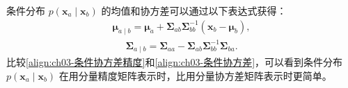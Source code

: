 \documentclass[../../main.tex]{subfiles}
\begin{document}
条件分布 $p(\boldsymbol{x}_{a}\mid\boldsymbol{x}_{b})$ 的均值和协方差可以通过以下表达式获得：
\begin{align}
\boldsymbol{\mu}_{a\mid b}=\boldsymbol{\mu}_{a}+\boldsymbol{\Sigma}_{ab}\boldsymbol{\Sigma}_{bb}^{-1}(\boldsymbol{x}_{b}-\boldsymbol{\mu}_{b}),
\label{align:ch03-条件均值}
\end{align}
\begin{align}
\boldsymbol{\Sigma}_{a\mid b}=\boldsymbol{\Sigma}_{aa}-\boldsymbol{\Sigma}_{ab}\boldsymbol{\Sigma}_{bb}^{-1}\boldsymbol{\Sigma}_{ba}.
\label{align:ch03-条件协方差}
\end{align}
比较\eqref{align:ch03-条件协方差精度}和\eqref{align:ch03-条件协方差}，可以看到条件分布 $p(\boldsymbol{x}_{a}\mid\boldsymbol{x}_{b})$ 在用分量精度矩阵表示时，比用分量协方差矩阵表示时更简单。
\end{document}
